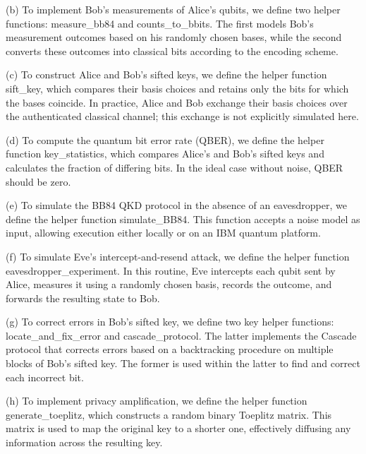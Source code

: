 (b) To implement Bob’s measurements of Alice’s qubits, we define two helper functions: measure\_bb84 and counts\_to\_bbits. The first models Bob’s measurement outcomes based on his randomly chosen bases, while the second converts these outcomes into classical bits according to the encoding scheme.

(c) To construct Alice and Bob's sifted keys, we define the helper function sift\_key, which compares their basis choices and retains only the bits for which the bases coincide. In practice, Alice and Bob exchange their basis choices over the authenticated classical channel; this exchange is not explicitly simulated here.

(d) To compute the quantum bit error rate (QBER), we define the helper function key\_statistics, which compares Alice’s and Bob’s sifted keys and calculates the fraction of differing bits. In the ideal case without noise, QBER should be zero.

(e) To simulate the BB84 QKD protocol in the absence of an eavesdropper, we define the helper function simulate\_BB84. This function accepts a noise model as input, allowing execution either locally or on an IBM quantum platform.

(f) To simulate Eve’s intercept-and-resend attack, we define the helper function eavesdropper\_experiment. In this routine, Eve intercepts each qubit sent by Alice, measures it using a randomly chosen basis, records the outcome, and forwards the resulting state to Bob.

(g) To correct errors in Bob's sifted key, we define two key helper functions: locate\_and\_fix\_error and cascade\_protocol. The latter implements the Cascade protocol that corrects errors based on a backtracking procedure on multiple blocks of Bob's sifted key. 
The former is used within the latter to find and correct each incorrect bit.

(h) To implement privacy amplification, we define the helper function generate\_toeplitz, which constructs a random binary Toeplitz matrix. This matrix is used to map the original key to a shorter one, effectively diffusing any information across the resulting key.